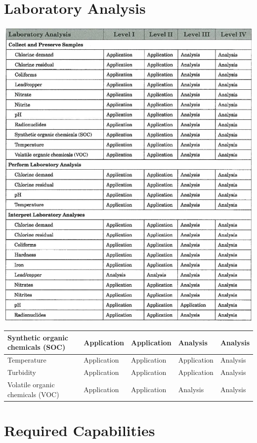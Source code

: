 \documentclass[10pt]{article}
\begin{document}
\section{Laboratory Analysis}
\includegraphics[max width=\textwidth]{2022_11_10_beeca89b60229885003dg-15}

\begin{tabular}{|l|l|l|l|l|}
\hline
Synthetic organic chemicals (SOC) & Application & Application & Analysis & Analysis \\
\hline
Temperature & Application & Application & Application & Analysis \\
\hline
Turbidity & Application & Application & Application & Analysis \\
\hline
Volatile organic chemicals (VOC) & Application & Application & Analysis & Analysis \\
\hline
\end{tabular}

\section{Required Capabilities}
\end{document}
